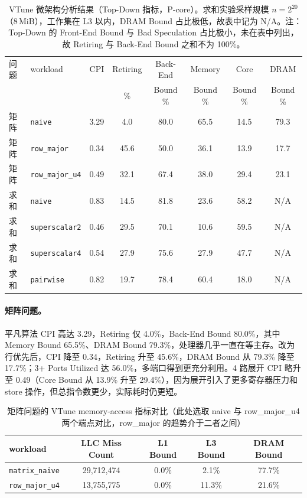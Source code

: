 \documentclass[a4paper,11pt,UTF8]{ctexart}
\begin{document}
\begin{table}[H]
  \centering\scriptsize
  \begin{tabular}{llcccccc}
    \toprule
    问题 & workload & CPI & Retiring & Back-End & Memory & Core & DRAM \\
    &          &     & \%       & Bound \% & Bound \% & Bound \% & Bound \% \\
    \midrule
    矩阵 & \texttt{naive}       & 3.29  & 4.0  & 80.0 & 65.5 & 14.5 & 79.3 \\
    矩阵 & \texttt{row\_major}  & 0.34  & 45.6 & 50.0 & 36.1 & 13.9 & 17.7 \\
    矩阵 & \texttt{row\_major\_u4} & 0.49 & 32.1 & 67.4 & 38.0 & 29.4 & 23.1 \\
    求和 & \texttt{naive}       & 0.83  & 14.5 & 81.8 & 23.6 & 58.2 & N/A \\
    求和 & \texttt{superscalar2}& 0.46  & 29.5 & 70.1 & 10.6 & 59.5 & N/A \\
    求和 & \texttt{superscalar4}& 0.54  & 27.9 & 75.6 & 27.9 & 47.7 & N/A \\
    求和 & \texttt{pairwise}    & 0.82  & 19.7 & 78.4 & 60.4 & 18.0 & N/A \\
    \bottomrule
  \end{tabular}
  \caption{VTune 微架构分析结果（Top-Down 指标，P-core）。求和实验采样规模 $n=2^{20}$（8\,MiB），工作集在 L3 以内，DRAM Bound 占比极低，故表中记为 N/A。注：Top-Down 的 Front-End Bound 与 Bad Speculation 占比极小，未在表中列出，故 Retiring 与 Back-End Bound 之和不为 100\%。}
  \label{tab:vtune_full}
\end{table}

\paragraph{矩阵问题。}
平凡算法 CPI 高达 3.29，Retiring 仅 4.0\%，Back-End Bound 80.0\%，其中 Memory Bound 65.5\%、DRAM Bound 79.3\%，处理器几乎一直在等主存。改为行优先后，CPI 降至 0.34，Retiring 升至 45.6\%，DRAM Bound 从 79.3\% 降至 17.7\%；3+ Ports Utilized 达 56.0\%，多端口得到更充分利用。4 路展开 CPI 略升至 0.49（Core Bound 从 13.9\% 升至 29.4\%），因为展开引入了更多寄存器压力和 store 操作，但总指令数更少，实际耗时仍更短。

\begin{table}[H]
  \centering\scriptsize
  \begin{tabular}{lcccc}
    \toprule
    workload & LLC Miss Count & L1 Bound & L3 Bound & DRAM Bound \\
    \midrule
    \texttt{matrix\_naive} & 29{,}712{,}474 & 0.0\% & 2.1\% & 77.7\% \\
    \texttt{row\_major\_u4} & 13{,}755{,}775 & 0.0\% & 11.3\% & 21.6\% \\
    \bottomrule
  \end{tabular}
  \caption{矩阵问题的 VTune memory-access 指标对比（此处选取 naive 与 row\_major\_u4 两个端点对比，row\_major 的趋势介于二者之间）}
  \label{tab:vtune_mem_matrix}
\end{table}
\end{document}
